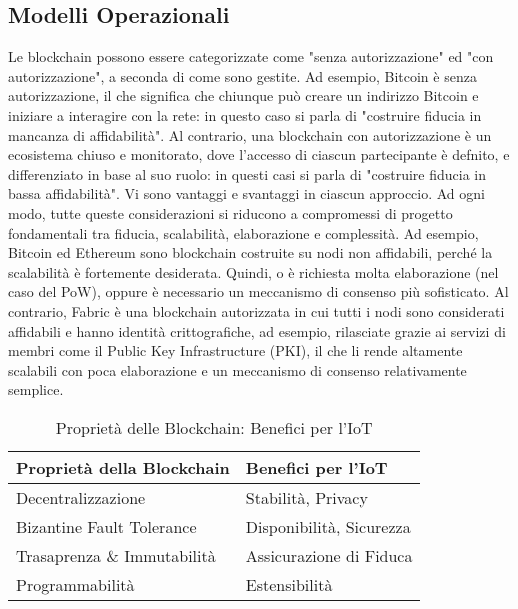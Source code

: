 \subsection{Modelli Operazionali}
Le blockchain possono essere categorizzate come "senza autorizzazione" ed "con autorizzazione", a seconda di come sono gestite. Ad esempio, Bitcoin è senza autorizzazione, il che significa che chiunque può creare un indirizzo Bitcoin e iniziare a interagire con la rete: in questo caso si parla di "costruire fiducia in mancanza di affidabilità". Al contrario, una blockchain con autorizzazione è un ecosistema chiuso e monitorato, dove l'accesso di ciascun partecipante è defnito, e differenziato in base al suo ruolo: in questi casi si parla di "costruire fiducia in bassa affidabilità".
Vi sono vantaggi e svantaggi in ciascun approccio. Ad ogni modo, tutte queste considerazioni si riducono a compromessi di progetto fondamentali tra fiducia, scalabilità, elaborazione e complessità. Ad esempio, Bitcoin ed Ethereum sono blockchain costruite su nodi non affidabili, perché la scalabilità è fortemente desiderata. Quindi, o è richiesta molta elaborazione (nel caso del PoW), oppure è necessario un meccanismo di consenso più sofisticato. Al contrario, Fabric \cite{c14} è una blockchain autorizzata in cui tutti i nodi sono considerati affidabili e hanno identità crittografiche, ad esempio, rilasciate grazie ai servizi di membri come il Public Key Infrastructure (PKI), il che li rende altamente scalabili con poca elaborazione e un meccanismo di consenso relativamente semplice.

\begin{table}[htp]%
	\caption{Proprietà delle Blockchain: Benefici per l'IoT}
	\label{table:BlockchainBenefits}\centering %
	\begin{tabular}{l|l}
		\hline
		Proprietà della Blockchain  & Benefici per l'IoT       \\
		\hline
		Decentralizzazione          & Stabilità, Privacy       \\
		Bizantine Fault Tolerance   & Disponibilità, Sicurezza \\
		Trasaprenza \& Immutabilità & Assicurazione di Fiduca  \\
		Programmabilità             & Estensibilità            \\
		\hline
	\end{tabular}
\end{table}
